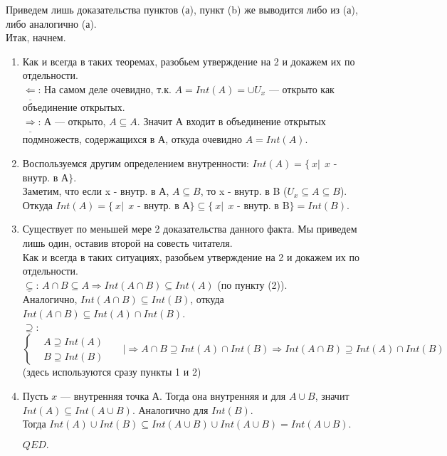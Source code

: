 \documentclass{article}
\begin{document}
\begin{spacing}{1.5}
\begin{enumerate}
\begin{enumerate}
\end{enumerate}
\end{enumerate}
Приведем лишь доказательства пунктов (а), пункт (b) же выводится либо из (а), либо аналогично (а).
\\ Итак, начнем.
\begin{enumerate}
\item Как и всегда в таких теоремах, разобьем утверждение на 2 и докажем их по отдельности.
\\ $\underline{\Leftarrow}$: На самом деле очевидно, т.к. $A = Int(A) = \cup U_{x}$ --- открыто как объединение открытых.
\\ $\underline{\Rightarrow}$: $А$ --- открыто, $A\subseteq A$. Значит А входит в объединение открытых подмножеств, содержащихся в А, откуда очевидно $A = Int(A)$.
\item Воспользуемся другим определением внутренности: $Int(A) = \lbrace~x|~~x$ - внутр. в А$\rbrace$.
\\ Заметим, что если x - внутр. в А, $A\subseteq B$, то x - внутр. в B ($U_{x}\subseteq A\subseteq B$). Откуда $Int(A) = \lbrace~x|~~x$ - внутр. в А$\rbrace\subseteq\lbrace~x|~~x$ - внутр. в B$\rbrace=Int(B)$.
\item Существует по меньшей мере 2 доказательства данного факта. Мы приведем лишь один, оставив второй на совесть читателя.
\\ Как и всегда в таких ситуациях, разобьем утверждение на 2 и докажем их по отдельности.
\\ $\underline{\subseteq}$: $A\cap B\subseteq A\Longrightarrow Int(A\cap B)\subseteq Int(A)$ (по пункту (2)).
\\Аналогично,  $Int(A\cap B)\subseteq Int(B)$, откуда $Int(A\cap B)\subseteq Int(A)\cap Int(B)$.
\\ $\underline{\supseteq}$: \begin{equation*}
\begin{cases}
    & A\supseteq Int(A)\\
    & B\supseteq Int(B)
 \end{cases}~~~~~~~|\Longrightarrow A\cap B \supseteq Int(A)\cap Int(B)\Longrightarrow Int(A\cap B)\supseteq Int(A)\cap Int(B)
\end{equation*}
(здесь используются сразу пункты 1 и 2)
\item Пусть $x$ --- внутренняя точка А. Тогда она внутренняя и для $A\cup B$, значит $Int(A)\subseteq Int(A\cup B)$. Аналогично для $Int(B)$.
\\ Тогда $Int(A)\cup Int(B)\subseteq Int(A\cup B)\cup Int(A\cup B)=Int(A\cup B)$.
 \begin{flushright}
$QED.$
\end{flushright}
\end{enumerate}

\end{spacing}
\end{document}
